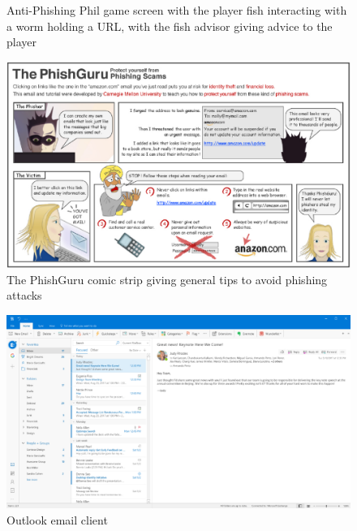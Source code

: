 \documentclass{l4proj}
\begin{document}
\begin{appendices}
\begin{figure}
    \caption{Anti-Phishing Phil game screen with the player fish interacting with a worm holding a URL, with the fish advisor giving advice to the player}
    \label{fig:antiphishingphil} 
\end{figure}
\begin{figure}
    \centering
    \includegraphics[width=1.1\linewidth]{images/phishguru.png}    
    \caption{The PhishGuru comic strip giving general tips to avoid phishing attacks }
    \label{fig:phishguru} 
\end{figure}

\begin{figure}
    \centering
    \includegraphics[width=1.1\linewidth]{images/outlook.png}
    \caption{Outlook email client}
    \label{fig:outlook}
\end{figure}


\end{appendices}
\end{document}
